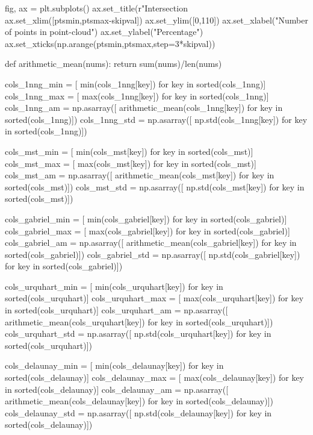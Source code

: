      fig, ax = plt.subplots()
     ax.set_title(r"Intersection \\%
     ax.set_xlim([ptsmin,ptsmax-skipval])
     ax.set_ylim([0,110])
     ax.set_xlabel("Number of points in point-cloud")
     ax.set_ylabel("Percentage")
     ax.set_xticks(np.arange(ptsmin,ptsmax,step=3*skipval))
     
     def arithmetic_mean(nums):
          return sum(nums)/len(nums)
     

     cols_1nng_min = [ min(cols_1nng[key]) for key in sorted(cols_1nng)]
     cols_1nng_max = [ max(cols_1nng[key]) for key in sorted(cols_1nng)]
     cols_1nng_am  = np.asarray([ arithmetic_mean(cols_1nng[key]) for key in sorted(cols_1nng)])
     cols_1nng_std = np.asarray([ np.std(cols_1nng[key]) for key in sorted(cols_1nng)])
     
     cols_mst_min = [ min(cols_mst[key]) for key in sorted(cols_mst)]
     cols_mst_max = [ max(cols_mst[key]) for key in sorted(cols_mst)]
     cols_mst_am  = np.asarray([ arithmetic_mean(cols_mst[key]) for key in sorted(cols_mst)])
     cols_mst_std = np.asarray([ np.std(cols_mst[key]) for key in sorted(cols_mst)])
   
     cols_gabriel_min = [ min(cols_gabriel[key]) for key in sorted(cols_gabriel)]
     cols_gabriel_max = [ max(cols_gabriel[key]) for key in sorted(cols_gabriel)]
     cols_gabriel_am  = np.asarray([ arithmetic_mean(cols_gabriel[key]) for key in sorted(cols_gabriel)])
     cols_gabriel_std = np.asarray([ np.std(cols_gabriel[key]) for key in sorted(cols_gabriel)])
     
     cols_urquhart_min = [ min(cols_urquhart[key]) for key in sorted(cols_urquhart)]
     cols_urquhart_max = [ max(cols_urquhart[key]) for key in sorted(cols_urquhart)]
     cols_urquhart_am  = np.asarray([ arithmetic_mean(cols_urquhart[key]) for key in sorted(cols_urquhart)])
     cols_urquhart_std = np.asarray([ np.std(cols_urquhart[key]) for key in sorted(cols_urquhart)])
  
     cols_delaunay_min = [ min(cols_delaunay[key]) for key in sorted(cols_delaunay)]
     cols_delaunay_max = [ max(cols_delaunay[key]) for key in sorted(cols_delaunay)]
     cols_delaunay_am = np.asarray([ arithmetic_mean(cols_delaunay[key]) for key in sorted(cols_delaunay)])
     cols_delaunay_std = np.asarray([ np.std(cols_delaunay[key]) for key in sorted(cols_delaunay)])

